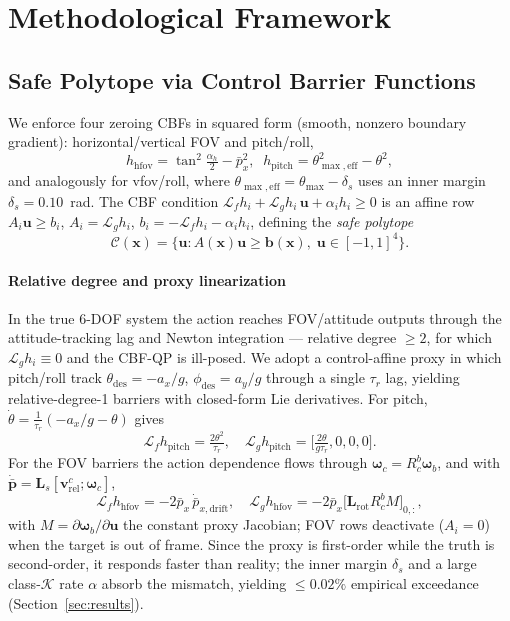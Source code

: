 \documentclass[journal]{IEEEtran}
\newcommand{\Lf}{\mathcal{L}_f}
\newcommand{\Lg}{\mathcal{L}_g}
\begin{document}
\section{Methodological Framework}
\label{sec:method}
\subsection{Safe Polytope via Control Barrier Functions}
We enforce four zeroing CBFs in squared form (smooth, nonzero boundary
gradient): horizontal/vertical FOV and pitch/roll,
\begin{equation}
h_{\mathrm{hfov}}\!=\!\tan^2\tfrac{\alpha_h}{2}\!-\!\bar p_x^2,\;\;
h_{\mathrm{pitch}}\!=\!\theta_{\max,\mathrm{eff}}^2\!-\!\theta^2,
\end{equation}
and analogously for vfov/roll, where $\theta_{\max,\mathrm{eff}}=
\theta_{\max}-\delta_s$ uses an inner margin $\delta_s=0.10$~rad. The CBF
condition $\Lf h_i+\Lg h_i\,\mathbf u+\alpha_i h_i\ge0$ is an affine row
$A_i\mathbf u\ge b_i$, $A_i=\Lg h_i$, $b_i=-\Lf h_i-\alpha_i h_i$, defining the
\emph{safe polytope}
\begin{equation}
\mathcal C(\mathbf x)=\{\mathbf u: A(\mathbf x)\mathbf u\ge\mathbf b(\mathbf x),\;
\mathbf u\in[-1,1]^4\}.
\label{eq:polytope}
\end{equation}

\paragraph{Relative degree and proxy linearization}
In the true 6-DOF system the action reaches FOV/attitude outputs through the
attitude-tracking lag and Newton integration --- relative degree $\ge2$, for
which $\Lg h_i\equiv0$ and the CBF-QP is ill-posed. We adopt a control-affine
proxy in which pitch/roll track $\theta_{\mathrm{des}}=-a_x/g$,
$\phi_{\mathrm{des}}=a_y/g$ through a single $\tau_r$ lag, yielding
relative-degree-1 barriers with closed-form Lie derivatives. For pitch,
$\dot\theta=\tfrac1{\tau_r}(-a_x/g-\theta)$ gives
\begin{equation}
\Lf h_{\mathrm{pitch}}=\tfrac{2\theta^2}{\tau_r},\quad
\Lg h_{\mathrm{pitch}}=\big[\tfrac{2\theta}{g\tau_r},0,0,0\big].
\label{eq:lie_pitch}
\end{equation}
For the FOV barriers the action dependence flows through
$\bm\omega_c=R_c^b\bm\omega_b$, and with
$\dot{\bar{\mathbf p}}=\mathbf L_s[\mathbf v^c_{\mathrm{rel}};\bm\omega_c]$,
\begin{equation}
\Lf h_{\mathrm{hfov}}=-2\bar p_x\,\dot{\bar p}_{x,\mathrm{drift}},\quad
\Lg h_{\mathrm{hfov}}=-2\bar p_x\big[\mathbf L_{\mathrm{rot}}R_c^b M\big]_{0,:},
\label{eq:lie_fov}
\end{equation}
with $M=\partial\bm\omega_b/\partial\mathbf u$ the constant proxy Jacobian; FOV
rows deactivate ($A_i=0$) when the target is out of frame. Since the proxy is
first-order while the truth is second-order, it responds faster than reality;
the inner margin $\delta_s$ and a large class-$\mathcal K$ rate $\alpha$
absorb the mismatch, yielding $\le0.02\%$ empirical exceedance
(Section~\ref{sec:results}).
\end{document}
